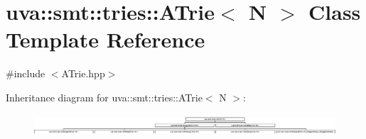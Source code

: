 \hypertarget{classuva_1_1smt_1_1tries_1_1_a_trie}{}\section{uva\+:\+:smt\+:\+:tries\+:\+:A\+Trie$<$ N $>$ Class Template Reference}
\label{classuva_1_1smt_1_1tries_1_1_a_trie}


{\ttfamily \#include $<$A\+Trie.\+hpp$>$}

Inheritance diagram for uva\+:\+:smt\+:\+:tries\+:\+:A\+Trie$<$ N $>$\+:\begin{figure}[H]
\begin{center}
\leavevmode
\includegraphics[height=0.788732cm]{classuva_1_1smt_1_1tries_1_1_a_trie}
\end{center}
\end{figure}
